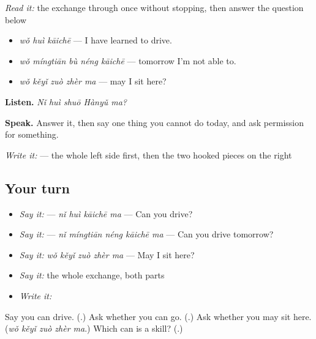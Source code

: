 \begin{tcolorbox}[breakable,skin=enhanced,colback=orange!6,colframe=orange!45!black,boxrule=0.5pt,arc=1mm,left=6pt,right=6pt,top=4pt,bottom=4pt,fonttitle=\bfseries,title={Read this}]
\emph{Read it:} the exchange through once without stopping, then answer the question below
\end{tcolorbox}

\begin{grammarlens}[title={What you've built — three cans}]
\begin{itemize}
\raggedright
  \item \textbf{} \emph{wǒ huì kāichē} — I have learned to drive.
  \item \textbf{} \emph{wǒ míngtiān bù néng kāichē} — tomorrow I'm not able to.
  \item \emph{wǒ kěyǐ zuò zhèr ma} — may I sit here?
\end{itemize}

\textbf{Listen.} \emph{Nǐ huì shuō Hànyǔ ma?}

\textbf{Speak.} Answer it, then say one thing you cannot do today, and ask permission for something.

\emph{Write it:}  — the whole left side first, then the two hooked pieces on the right
\end{grammarlens}

\subsection*{Your turn}
\begin{itemize}
\raggedright
  \item \emph{Say it:}  — \emph{nǐ huì kāichē ma} — Can you drive?
  \item \emph{Say it:}  — \emph{nǐ míngtiān néng kāichē ma} — Can you drive tomorrow?
  \item \emph{Say it:} \emph{wǒ kěyǐ zuò zhèr ma} — May I sit here?
  \item \emph{Say it:} the whole exchange, both parts
  \item \emph{Write it:} 
\end{itemize}

\begin{tcolorbox}[breakable,colback=teal!4,colframe=teal!35!black,title={Before you move on}]
Say you can drive. (\textbf{}.) Ask whether you can go. (\textbf{}.) Ask whether you may sit here. (\emph{wǒ kěyǐ zuò zhèr ma}.) Which can is a skill? (\textbf{}.)
\end{tcolorbox}

